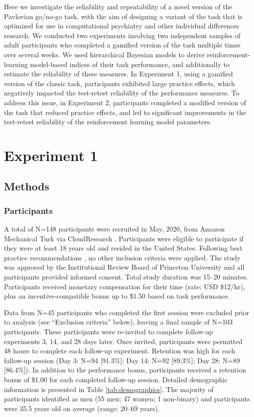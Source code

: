 \documentclass[a4paper,12pt]{article}
\begin{document}
\begin{refsection}[main]
Here we investigate the reliability and repeatability of a novel version of the Pavlovian go/no-go task, with the aim of designing a variant of the task that is optimized for use in computational psychiatry and other individual differences research. We conducted two experiments involving two independent samples of adult participants who completed a gamified version of the task multiple times over several weeks. We used hierarchical Bayesian models to derive reinforcement-learning model-based indices of their task performance, and additionally to estimate the reliability of these measures. In Experiment 1, using a gamified version of the classic task, participants exhibited large practice effects, which negatively impacted the test-retest reliability of the performance measures. To address this issue, in Experiment 2, participants completed a modified version of the task that reduced practice effects, and led to significant improvements in the test-retest reliability of the reinforcement learning model parameters.

\section*{Experiment 1}

\subsection*{Methods}

\subsubsection*{Participants}

A total of N=148 participants were recruited in May, 2020, from Amazon Mechanical Turk via CloudResearch \cite{litman2017turkprime}. Participants were eligible to participate if they were at least 18 years old and resided in the United States. Following best practice recommendations \cite{robinson2019tapped}, no other inclusion criteria were applied. The study was approved by the Institutional Review Board of Princeton University and all participants provided informed consent. Total study duration was 15--20 minutes. Participants received monetary compensation for their time (rate: USD \$12/hr), plus an incentive-compatible bonus up to \$1.50 based on task performance. 

Data from N=45 participants who completed the first session were excluded prior to analysis (see ``Exclusion criteria'' below), leaving a final sample of N=103 participants. These participants were re-invited to complete follow-up experiments 3, 14, and 28 days later. Once invited, participants were permitted 48 hours to complete each follow-up experiment. Retention was high for each follow-up session (Day 3: N=94 [91.3\%]; Day 14: N=92 [89.3\%]; Day 28: N=89 [86.4\%]). In addition to the performance bonus, participants received a retention bonus of \$1.00 for each completed follow-up session. Detailed demographic information is presented in Table \ref{tab:demographics}. The majority of participants identified as men (55 men; 47 women; 1 non-binary) and participants were 35.5 years old on average (range: 20--69 years).


\end{refsection}
\end{document}
